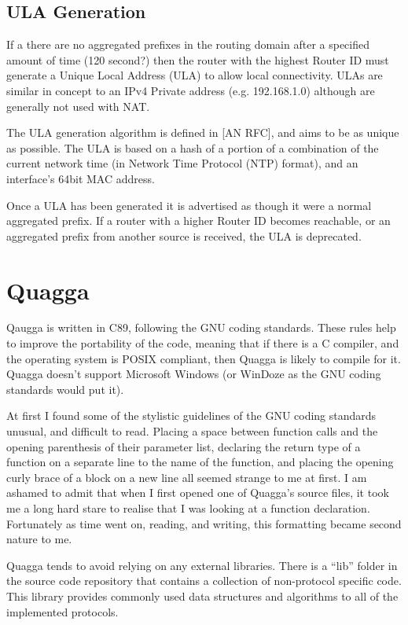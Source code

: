 \documentclass[12pt]{report}
\begin{document}
\subsection{ULA Generation}
If a there are no aggregated prefixes in the routing domain after a specified
amount of time (120 second?) then the router with the highest Router ID must
generate a Unique Local Address (ULA) 
to allow local connectivity. ULAs are similar in concept to an IPv4 Private
address (e.g. 192.168.1.0) although are generally not used with NAT\@. 

The ULA generation algorithm is defined in [AN RFC], and aims to be as unique
as possible. The ULA is based on a hash of a portion of a combination of the 
current network time (in Network Time Protocol (NTP)  format), and an interface's 64bit MAC address. 

Once a ULA has been generated it is advertised as though it were a normal
aggregated prefix. If a router with a higher Router ID becomes reachable, or an
aggregated prefix from another source is received, the ULA is deprecated. 

\section{Quagga}
Qaugga is written in C89, following the GNU coding standards. These rules help
to improve the portability of the code, meaning that if there is a C compiler,
and the operating system is POSIX compliant, then Quagga is likely to compile
for it.  Quagga doesn't support Microsoft Windows (or WinDoze as the GNU coding
standards would put it). 

At first I found some of the stylistic guidelines of the GNU coding standards
unusual, and difficult to read. Placing a space between function calls and the
opening parenthesis of their parameter list, declaring the return type of a
function on a separate line to the name of the function, and placing the
opening curly brace of a block on a new line all seemed strange to me at first.
I am ashamed to admit that when I first opened one of Quagga's source files, it
took me a long hard stare to realise that I was looking at a function
declaration. Fortunately as time went on, reading, and writing, this formatting
became second nature to me. 

Quagga tends to avoid relying on any external libraries. There is a ``lib''
folder in the source code repository that contains a collection of non-protocol 
specific code. This library provides commonly used data structures and 
algorithms to all of the implemented protocols. 
\end{document}
